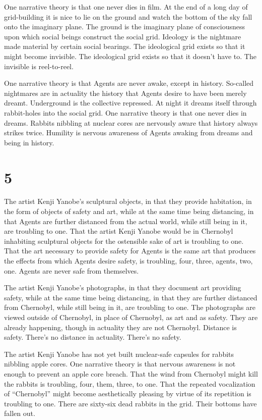 \documentclass[
]{memoir}
\begin{document}
One narrative theory is that one never dies in film. At the end of a
long day of grid-building it is nice to lie on the ground and watch the
bottom of the sky fall onto the imaginary plane. The ground is the
imaginary plane of consciousness upon which social beings construct the
social grid. Ideology is the nightmare made material by certain social
bearings. The ideological grid exists so that it might become invisible.
The ideological grid exists so that it doesn't have to. The invisible is
reel-to-reel.

One narrative theory is that Agents are never awake, except in history.
So-called nightmares are in actuality the history that Agents desire to
have been merely dreamt. Underground is the collective repressed. At
night it dreams itself through rabbit-holes into the social grid. One
narrative theory is that one never dies in dreams. Rabbits nibbling at
nuclear cores are nervously aware that history always strikes twice.
Humility is nervous awareness of Agents awaking from dreams and being in
history.

\hypertarget{section-6}{%
\section*{5}\label{section-6}}

The artist Kenji Yanobe's sculptural objects, in that they provide
habitation, in the form of objects of safety and art, while at the same
time being distancing, in that Agents are further distanced from the
actual world, while still being in it, are troubling to one. That the
artist Kenji Yanobe would be in Chernobyl inhabiting sculptural objects
for the ostensible sake of art is troubling to one. That the art
necessary to provide safety for Agents is the same art that produces the
effects from which Agents desire safety, is troubling, four, three,
agents, two, one. Agents are never safe from themselves.

The artist Kenji Yanobe's photographs, in that they document art
providing safety, while at the same time being distancing, in that they
are further distanced from Chernobyl, while still being in it, are
troubling to one. The photographs are viewed outside of Chernobyl, in
place of Chernobyl, as art and as safety. They are already happening,
though in actuality they are not Chernobyl. Distance is safety. There's
no distance in actuality. There's no safety.

The artist Kenji Yanobe has not yet built nuclear-safe capsules for
rabbits nibbling apple cores. One narrative theory is that nervous
awareness is not enough to prevent an apple core breach. That the wind
from Chernobyl might kill the rabbits is troubling, four, them, three,
to one. That the repeated vocalization of ``Chernobyl'' might become
aesthetically pleasing by virtue of its repetition is troubling to one.
There are sixty-six dead rabbits in the grid. Their bottoms have fallen
out.
\end{document}

